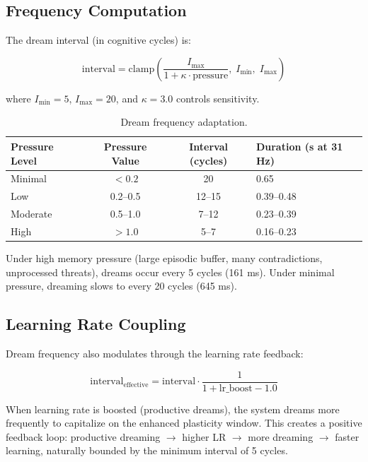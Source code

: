 \documentclass[11pt,a4paper]{article}
\begin{document}
\subsection{Frequency Computation}

The dream interval (in cognitive cycles) is:

\begin{equation}
\text{interval} = \text{clamp}\left(\frac{I_{\text{max}}}{1 + \kappa \cdot \text{pressure}}, \; I_{\min}, \; I_{\max}\right)
\end{equation}

where $I_{\min} = 5$, $I_{\max} = 20$, and $\kappa = 3.0$ controls sensitivity.

\begin{table}[h]
\centering
\caption{Dream frequency adaptation.}
\label{tab:frequency}
\begin{tabular}{@{}lccl@{}}
\toprule
Pressure Level & Pressure Value & Interval (cycles) & Duration (s at 31 Hz) \\
\midrule
Minimal & $< 0.2$ & 20 & 0.65 \\
Low & 0.2--0.5 & 12--15 & 0.39--0.48 \\
Moderate & 0.5--1.0 & 7--12 & 0.23--0.39 \\
High & $> 1.0$ & 5--7 & 0.16--0.23 \\
\bottomrule
\end{tabular}
\end{table}

Under high memory pressure (large episodic buffer, many contradictions, unprocessed threats), dreams occur every 5 cycles (161 ms). Under minimal pressure, dreaming slows to every 20 cycles (645 ms).

\subsection{Learning Rate Coupling}

Dream frequency also modulates through the learning rate feedback:

\begin{equation}
\text{interval}_{\text{effective}} = \text{interval} \cdot \frac{1}{1 + \text{lr\_boost} - 1.0}
\end{equation}

When learning rate is boosted (productive dreams), the system dreams more frequently to capitalize on the enhanced plasticity window. This creates a positive feedback loop: productive dreaming $\to$ higher LR $\to$ more dreaming $\to$ faster learning, naturally bounded by the minimum interval of 5 cycles.
\end{document}
